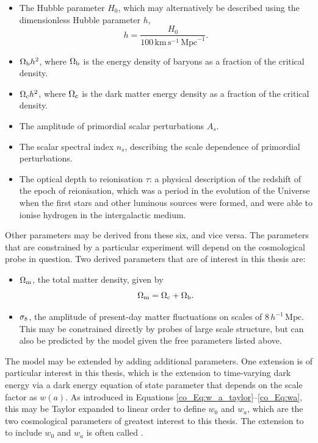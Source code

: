 \begin{itemize}
\item The Hubble parameter $H_0$, which may alternatively be described using the dimensionless Hubble parameter $h$,
\begin{equation}
h = \frac{H_0}{100\,\text{km}\,\text{s}^{-1}\,\text{Mpc}^{-1}}.
\label{co_Eq:h_definition}
\end{equation}
\item $\Omega_\text{b} h^2$, where $\Omega_\text{b}$ is the energy density of baryons as a fraction of the critical density.
\item $\Omega_\text{c} h^2$, where $\Omega_\text{c}$ is the dark matter energy density as a fraction of the critical density.
\item The amplitude of primordial scalar perturbations $A_s$.
\item The scalar spectral index $n_s$, describing the scale dependence of primordial perturbations.
\item The optical depth to reionisation $\tau$: a physical description of the redshift of the epoch of reionisation, which was a period in the evolution of the Universe when the first stars and other luminous sources were formed, and were able to ionise hydrogen in the intergalactic medium.
\end{itemize}

Other parameters may be derived from these six, and vice versa. The parameters that are constrained by a particular experiment will depend on the cosmological probe in question. Two derived parameters that are of interest in this thesis are:
\begin{itemize}
\item $\Omega_\text{m}$, the total matter density, given by
\begin{equation}
\Omega_\text{m} = \Omega_\text{c} + \Omega_\text{b}.
\end{equation}
\item $\sigma_8$, the amplitude of present-day matter fluctuations on scales of $8\,h^{-1}\,\text{Mpc}$. This may be constrained directly by probes of large scale structure, but can also be predicted by the \lcdm{} model given the free parameters listed above.
\end{itemize}

The \lcdm{} model may be extended by adding additional parameters. One extension is of particular interest in this thesis, which is the extension to time-varying dark energy via a dark energy equation of state parameter that depends on the scale factor as $w \left( a \right)$. As introduced in Equations \eqref{co_Eq:w_a_taylor}--\eqref{co_Eq:wa}, this may be Taylor expanded to linear order to define $w_0$ and $w_a$, which are the two cosmological parameters of greatest interest to this thesis. The extension to \lcdm{} to include $w_0$ and $w_a$ is often called \wcdm{}.

